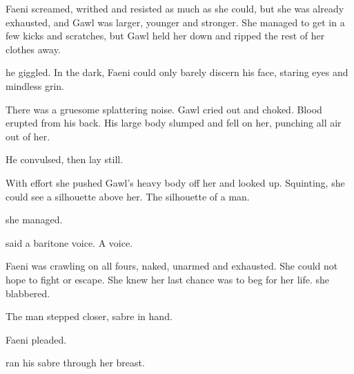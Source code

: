 
Faeni screamed, writhed and resisted as much as she could, but she was already exhausted, and Gawl was larger, younger and stronger. 
She managed to get in a few kicks and scratches, but Gawl held her down and ripped the rest of her clothes away. 

 he giggled. 
In the dark, Faeni could only barely discern his face, staring eyes and mindless grin. 


There was a gruesome splattering noise. 
Gawl cried out and choked. 
Blood erupted from his back.
His large body slumped and fell on her, punching all air out of her. 

He convulsed, then lay still. 


With effort she pushed Gawl's heavy body off her and looked up. 
Squinting, she could see a silhouette above her. 
The silhouette of a man. 

 she managed. 

 said a baritone voice. 
A \human voice. 

Faeni was crawling on all fours, naked, unarmed and exhausted. 
She could not hope to fight or escape. 
She knew her last chance was to beg for her life.
 she blabbered.


The man stepped closer, sabre in hand.

 Faeni pleaded. 


\Shachar ran his sabre through her breast.



